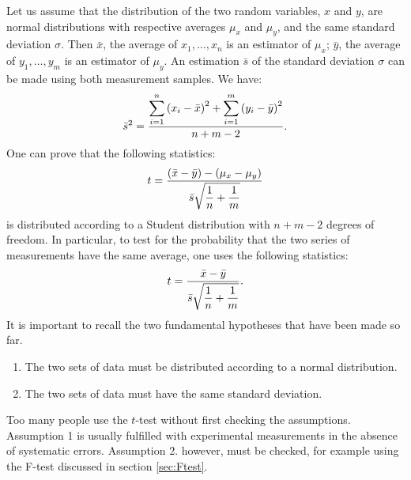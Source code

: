 \documentclass[twoside]{book}
\begin{document}
Let us assume that the distribution of the two random variables,
$x$ and $y$, are normal distributions with respective averages
$\mu_x$ and $\mu_y$, and the same standard deviation $\sigma$.
Then $\bar{x}$, the average of $x_1,\ldots,x_n$ is an estimator of
$\mu_x$; $\bar{y}$, the average of $y_1,\ldots,y_m$ is an
estimator of $\mu_y$. An estimation $\bar{s}$ of the standard
deviation $\sigma$ can be made using both measurement samples. We
have:
\begin{equation}
\label{eq:sbart}
  \bar{s}^2={\displaystyle\sum_{i=1}^n\left(x_i-\bar{x}\right)^2
  + \sum_{i=1}^m\left(y_i-\bar{y}\right)^2\over\displaystyle n+m-2}.
\end{equation}
One can prove that the following statistics:
\begin{equation}
  t={\displaystyle \left(\bar{x}-\bar{y}\right)-\left(\mu_x
  -\mu_y\right)
  \over\displaystyle \bar{s}\sqrt{{1\over n}+{1\over m}}}
\end{equation}
is distributed according to a Student distribution with $n+m-2$
degrees of freedom. In particular, to test for the probability
that the two series of measurements have the same average, one
uses the following statistics:
\begin{equation}
\label{eq:tTest}
  t={\displaystyle \bar{x}-\bar{y}
  \over\displaystyle \bar{s}\sqrt{{1\over n}+{1\over m}}}.
\end{equation}
It is important to recall the two fundamental hypotheses that have
been made so far.
\begin{enumerate}
  \item The two sets of data must be distributed according to a normal distribution.
  \item The two sets of data must have the same standard deviation.
\end{enumerate}
Too many people use the $t$-test without first checking the
assumptions. Assumption 1 is usually fulfilled with experimental
measurements in the absence of systematic errors. Assumption 2.
however, must be checked, for example using the F-test discussed
in section \ref{sec:Ftest}.
\end{document}
